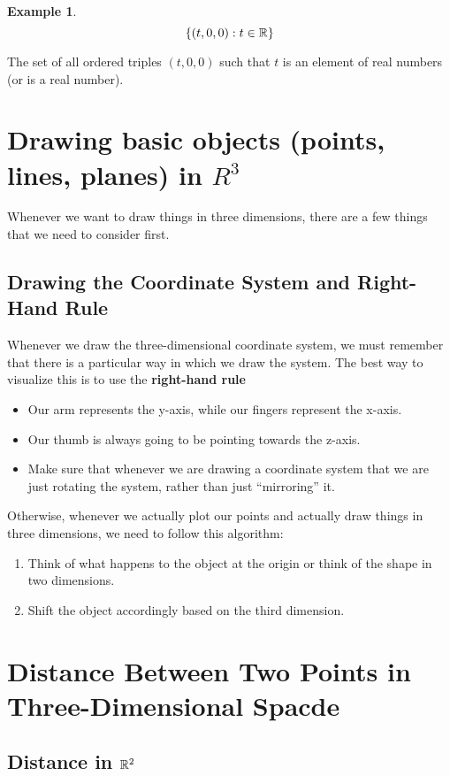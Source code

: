 \documentclass{report}
\newtheorem*{remark*}{Example}
\begin{document}
\begin{sloppypar}
\begin{remark*}
  \[ \{(t, 0, 0): t \in \mathbb{R} \} \]
\end{remark*}
\begin{definition*}
  The set of all ordered triples $ (t, 0, 0 ) $ such that
  $ t $ is an element of real numbers (or is a real number).
\end{definition*}

\section{Drawing basic objects (points, lines, planes) in $
  R^{3}$}
Whenever we want to draw things in three dimensions, there
are a few things that we need to consider first.

\subsection{Drawing the Coordinate System and Right-Hand Rule}
Whenever we draw the three-dimensional coordinate system,
we must remember that there is a particular way in
which we draw the system. The best way to visualize
this is to use the \textbf{right-hand rule}
\begin{itemize}
  \item Our arm represents the y-axis, while our
        fingers represent the x-axis.
  \item Our thumb is always going to be pointing towards
        the z-axis.
  \item Make sure that whenever we are drawing
        a coordinate system that we are just rotating
        the system, rather than just ``mirroring'' it.
\end{itemize}
Otherwise, whenever we actually plot our points
and actually draw things in three dimensions, we need
to follow this algorithm:
\begin{enumerate}
  \item Think of what happens to the object at the origin or
        think of the shape in two dimensions.
  \item Shift the object accordingly based on the
        third dimension.
\end{enumerate}


\section{Distance Between Two Points in Three-Dimensional
  Spacde}
\subsection{Distance in $ \mathbb{R}^{2} $}
\newtheorem{lem}{Formula}
\begin{center}
\end{center}


\end{sloppypar}
\end{document}
